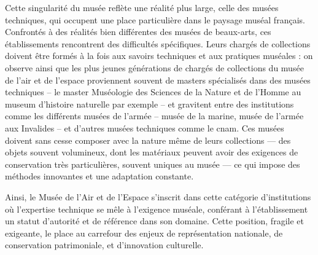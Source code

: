 Cette singularité du musée reflète une réalité plus large, celle des musées techniques, qui occupent une place particulière dans le paysage muséal français. Confrontés à des réalités bien différentes des musées de beaux-arts, ces établissements rencontrent des difficultés spécifiques. Leurs chargés de collections doivent être formés à la fois aux savoirs techniques et aux pratiques muséales : on observe ainsi que les plus jeunes générations de chargés de collections du musée de l'air et de l'espace proviennent souvent de masters spécialisés dans des musées techniques -- le master Muséologie des Sciences de la Nature et de l'Homme au museum d'histoire naturelle par exemple -- et gravitent entre des institutions comme les différents musées de l'armée -- musée de la marine, musée de l'armée aux Invalides -- et d'autres musées techniques comme le \ac{cnam}. Ces musées doivent sans cesse composer avec la nature même de leurs collections — des objets souvent volumineux, dont les matériaux peuvent avoir des exigences de conservation très particulières, souvent uniques au musée — ce qui impose des méthodes innovantes et une adaptation constante.

Ainsi, le Musée de l’Air et de l’Espace s’inscrit dans cette catégorie d’institutions où l’expertise technique se mêle à l’exigence muséale, conférant à l’établissement un statut d’autorité et de référence dans son domaine. Cette position, fragile et exigeante, le place au carrefour des enjeux de représentation nationale, de conservation patrimoniale, et d’innovation culturelle.
